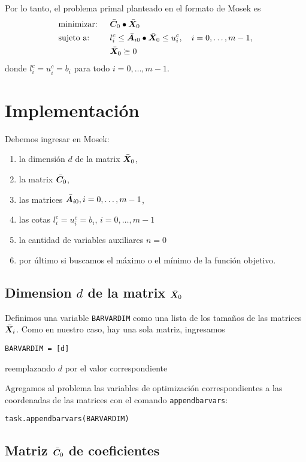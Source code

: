 \documentclass[11pt]{article}
\begin{document}
Por lo tanto, el problema primal planteado en el formato de Mosek es
\begin{alignat*}{2}
  & \text{minimizar: } & & \bar {\bm{C}}_0 \bullet \bar {\bm{X}}_0 \\
  & \text{sujeto a: }  \quad & & l_i^c \le \bar {\bm{A}}_{i0} \bullet \bar {\bm{X}}_0 \le u_i^c, \quad i = 0, \dots, m-1, \\
  & & & \bar {\bm{X}}_0 \succeq 0
\end{alignat*}
donde $l_i^c = u_i^c = b_i$ para todo $i = 0, \dots, m-1$.

\section{Implementación}

Debemos ingresar en Mosek: 
\begin{enumerate}
\item la dimensión $d$ de la matrix $\bar {\bm{X}}_0$, 
\item la matrix $\bar {\bm{C}}_0$, 
\item las matrices $\bar {\bm{A}}_{i0}, i = 0, \dots, m-1$, 
\item las cotas $l_i^c = u_i^c = b_i$, $i = 0, \dots, m-1$
\item la cantidad de variables auxiliares $n = 0$
\item por último si buscamos el máximo o el mínimo de la función objetivo.
\end{enumerate}

\subsection{Dimension $d$ de la matrix $\bar {\bm{X}}_0$}

Definimos una variable \texttt{BARVARDIM} como una lista de los tamaños de las matrices $\bar {\bm{X}}_i$. Como en nuestro caso, hay una sola matriz, ingresamos
\begin{lstlisting}
BARVARDIM = [d]
\end{lstlisting}
reemplazando $d$ por el valor correspondiente

Agregamos al problema las variables de optimización correspondientes a las coordenadas de las matrices con el comando \texttt{appendbarvars}:

\begin{lstlisting}
task.appendbarvars(BARVARDIM)
\end{lstlisting}


\subsection{Matriz $\bar {\bm{C}}_0$ de coeficientes}
\end{document}
